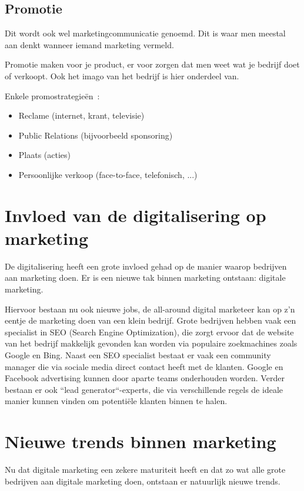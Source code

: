 \subsection{Promotie} \label{sec:marketing-promotie}
Dit wordt ook wel marketingcommunicatie genoemd. Dit is waar men meestal aan denkt wanneer iemand marketing vermeld.

Promotie maken voor je product, er voor zorgen dat men weet wat je bedrijf doet of verkoopt. Ook het imago van het bedrijf is hier onderdeel van.

Enkele promostrategieën~\autocite{marketingscriptie.nl2018}:
\begin{itemize}
	\item Reclame (internet, krant, televisie)
	\item Public Relations (bijvoorbeeld sponsoring)
	\item Plaats (acties)
	\item Persoonlijke verkoop (face-to-face, telefonisch, ...)
\end{itemize}

\section{Invloed van de digitalisering op marketing} \label{sec:digitalisering-marketing}
De digitalisering heeft een grote invloed gehad op de manier waarop bedrijven aan marketing doen. Er is een nieuwe tak binnen marketing ontstaan: digitale marketing. 

Hiervoor bestaan nu ook nieuwe jobs, de all-around digital marketeer kan op z'n eentje de marketing doen van een klein bedrijf. Grote bedrijven hebben vaak een specialist in SEO (Search Engine Optimization), die zorgt ervoor dat de website van het bedrijf makkelijk gevonden kan worden via populaire zoekmachines zoals Google en Bing. Naast een SEO specialist bestaat er vaak een community manager die via sociale media direct contact heeft met de klanten. Google en Facebook advertising kunnen door aparte teams onderhouden worden. Verder bestaan er ook ``lead generator``-experts, die via verschillende regels de ideale manier kunnen vinden om potentiële klanten binnen te halen.

\section{Nieuwe trends binnen marketing} \label{sec:nieuwe-trends-marketing}
Nu dat digitale marketing een zekere maturiteit heeft en dat zo wat alle grote bedrijven aan digitale marketing doen, ontstaan er natuurlijk nieuwe trends. 

